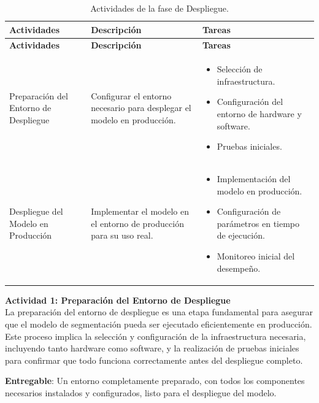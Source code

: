 \vspace{2ex}
 \begingroup
 \renewcommand\arraystretch{1.2}
 \begin{longtable}{p{4cm} p{6cm} p{6cm}}
 \caption{Actividades de la fase de Despliegue.}
 \label{tabla:despliegue}\\
 \toprule
 \textbf{Actividades} & \textbf{Descripción} & \textbf{Tareas} \\
 \midrule
 \endfirsthead
 
 \toprule
 \textbf{Actividades} & \textbf{Descripción} & \textbf{Tareas} \\
 \midrule
 \endhead
 
 \bottomrule
 \endfoot
 
 Preparación del Entorno de Despliegue & Configurar el entorno necesario para desplegar el modelo en producción. & 
    \begin{itemize}
        \item Selección de infraestructura.
        \item Configuración del entorno de hardware y software.
        \item Pruebas iniciales.
    \end{itemize} \\
 
 Despliegue del Modelo en Producción & Implementar el modelo en el entorno de producción para su uso real. & 
 \begin{itemize}
     \item Implementación del modelo en producción.
     \item Configuración de parámetros en tiempo de ejecución.
     \item Monitoreo inicial del desempeño.
 \end{itemize} \\
 \end{longtable}
 \endgroup

\textbf{Actividad 1: Preparación del Entorno de Despliegue}
\\
La preparación del entorno de despliegue es una etapa fundamental para asegurar que el modelo de segmentación pueda ser ejecutado eficientemente en producción. Este proceso implica la selección y configuración de la infraestructura necesaria, incluyendo tanto hardware como software, y la realización de pruebas iniciales para confirmar que todo funciona correctamente antes del despliegue completo.

\textbf{Entregable}: Un entorno completamente preparado, con todos los componentes necesarios instalados y configurados, listo para el despliegue del modelo.

